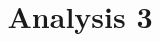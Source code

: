 \title{Analysis 3}
\pretitle{\pagestyle{empty}\begin{center}  \Huge \bfseries}
	\renewcommand{\maketitlehookb}{\centering \Large  \textit{Vorlesungsmitschriften im Wintersemester 2018/19}}
\date{}
